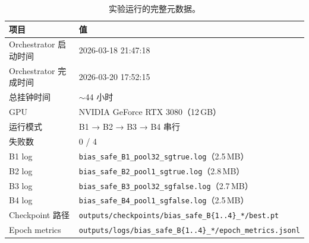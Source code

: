 \documentclass[11pt,a4paper]{ctexart}
\begin{document}
\begin{table}[H]
\centering
\small
\caption{实验运行的完整元数据。}
\begin{tabular}{l l}
\toprule
项目 & 值 \\
\midrule
Orchestrator 启动时间 & 2026-03-18 21:47:18 \\
Orchestrator 完成时间 & 2026-03-20 17:52:15 \\
总挂钟时间 & $\sim$44 小时 \\
GPU & NVIDIA GeForce RTX 3080（12\,GB） \\
运行模式 & B1 → B2 → B3 → B4 串行 \\
失败数 & 0 / 4 \\
\midrule
B1 log & \texttt{bias\_safe\_B1\_pool32\_sgtrue.log}（2.5\,MB） \\
B2 log & \texttt{bias\_safe\_B2\_pool1\_sgtrue.log}（2.8\,MB） \\
B3 log & \texttt{bias\_safe\_B3\_pool32\_sgfalse.log}（2.7\,MB） \\
B4 log & \texttt{bias\_safe\_B4\_pool1\_sgfalse.log}（2.5\,MB） \\
\midrule
Checkpoint 路径 & \texttt{outputs/checkpoints/bias\_safe\_B\{1..4\}\_*/best.pt} \\
Epoch metrics & \texttt{outputs/logs/bias\_safe\_B\{1..4\}\_*/epoch\_metrics.jsonl} \\
\bottomrule
\end{tabular}
\end{table}
\end{document}
